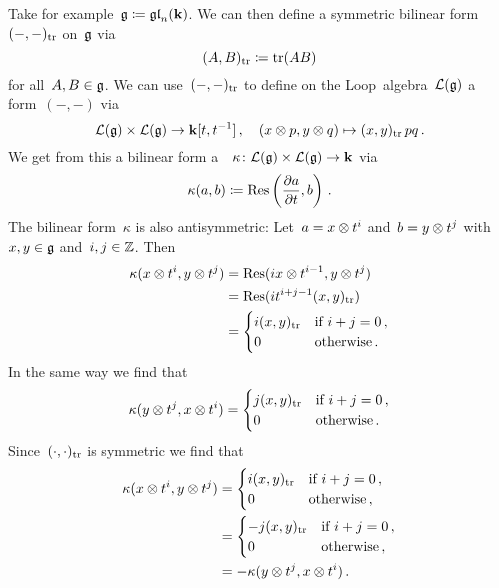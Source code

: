 \begin{example}
  Take for example~$\mathfrak{g} \coloneqq \mathfrak{gl}_n(\mathbf{k})$.
  We can then define a symmetric bilinear form~$(-,-)_{\operatorname{tr}}$ on~$\mathfrak{g}$ via
  \[
    (A,B)_{\operatorname{tr}}
    \coloneqq
    \operatorname{tr}(AB)
  \]
  for all~$A, B \in \mathfrak{g}$.
  We can use~$(-,-)_{\operatorname{tr}}$ to define on the Loop~algebra~$\mathcal{L}(\mathfrak{g})$ a~{} form~$(-,-)$ via
  \[
    \mathcal{L}(\mathfrak{g}) \times \mathcal{L}(\mathfrak{g})
    \to
    \mathbf{k}[t,t^{-1}] \,,
    \quad
    (x \otimes p, y \otimes q)
    \mapsto
    (x,y)_{\operatorname{tr}} \, pq \,.
  \]
  We get from this a bilinear form a~{\twococycle}~$\kappa \colon \mathcal{L}(\mathfrak{g}) \times \mathcal{L}(\mathfrak{g}) \to \mathbf{k}$ via
  \[
    \kappa(a,b)
    \coloneqq
    \operatorname{Res}\left( \frac{\partial a}{\partial t}, b \right) \,.
  \]
  The bilinear form~$\kappa$ is also antisymmetric:
  Let~$a = x \otimes t^i$ and~$b = y \otimes t^j$ with~$x,y \in \mathfrak{g}$ and~$i,j \in \mathbb{Z}$.
  Then
  \begin{align*}
    \kappa(x \otimes t^i, y \otimes t^j)
    &=
    \operatorname{Res}(i x \otimes t^{i-1}, y \otimes t^j)
    \\
    &= 
    \operatorname{Res}(i t^{i+j-1} (x,y)_{\operatorname{tr}})
    \\
    &=
    \begin{cases}
      i (x,y)_{\operatorname{tr}} & \text{if $i+j = 0$} \,,\\
                  0 & \text{otherwise}  \,.
    \end{cases}
  \end{align*}
  In the same way we find that
  \[
    \kappa(y \otimes t^j, x \otimes t^i)
    =
    \begin{cases}
      j (x,y)_{\operatorname{tr}} & \text{if $i+j = 0$} \,, \\
                  0 & \text{otherwise}  \,.
    \end{cases}
  \]
  Since~$(\cdot,\cdot)_{\operatorname{tr}}$ is symmetric we find that
  \begin{align*}
    \kappa(x \otimes t^i, y \otimes t^j)
    &=
    \begin{cases}
    i (x,y)_{\operatorname{tr}} & \text{if $i+j = 0$} \,, \\
                0 & \text{otherwise}  \,,
    \end{cases} \\
    &=
    \begin{cases}
    -j (x,y)_{\operatorname{tr}} & \text{if $i+j = 0$}  \,, \\
                  0 & \text{otherwise}  \,,
    \end{cases} \\
    &=
    -\kappa(y \otimes t^j, x \otimes t^i) \,.
  \end{align*}
\end{example}


